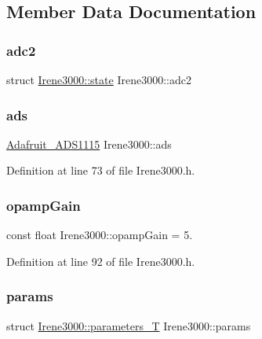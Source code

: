 \subsection{Member Data Documentation}
\mbox{\label{class_irene3000_aae3a95a1c83c766cd2f299ce471c337e}} 
\subsubsection{\texorpdfstring{adc2}{adc2}}
{\footnotesize\ttfamily struct \hyperlink{struct_irene3000_1_1state}{Irene3000\+::state} Irene3000\+::adc2\hspace{0.3cm}{\ttfamily [private]}}

\mbox{\label{class_irene3000_a1215e77ba761c9908d80d691f149e135}} 
\subsubsection{\texorpdfstring{ads}{ads}}
{\footnotesize\ttfamily \hyperlink{class_adafruit___a_d_s1115}{Adafruit\+\_\+\+A\+D\+S1115} Irene3000\+::ads\hspace{0.3cm}{\ttfamily [private]}}



Definition at line 73 of file Irene3000.\+h.

\mbox{\label{class_irene3000_a4e588985ca74e5076029d5dee81034f2}} 
\subsubsection{\texorpdfstring{opamp\+Gain}{opampGain}}
{\footnotesize\ttfamily const float Irene3000\+::opamp\+Gain = 5.\hspace{0.3cm}{\ttfamily [private]}}



Definition at line 92 of file Irene3000.\+h.

\mbox{\label{class_irene3000_a136585a5ee7f9ac6ab52175fa153f8e3}} 
\subsubsection{\texorpdfstring{params}{params}}
{\footnotesize\ttfamily struct \hyperlink{struct_irene3000_1_1parameters___t}{Irene3000\+::parameters\+\_\+T} Irene3000\+::params\hspace{0.3cm}{\ttfamily [private]}}

